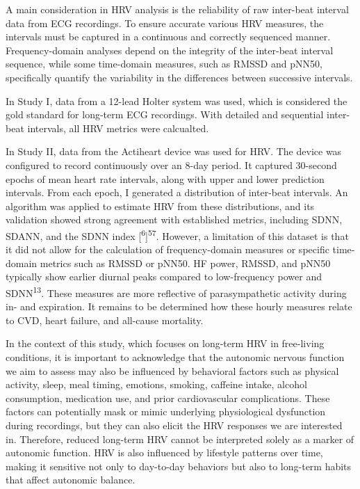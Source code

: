 \documentclass[
  a4paper,
  headsepline=true,
  open=any]{scrbook}
\begin{document}
A main consideration in HRV analysis is the reliability of raw
inter-beat interval data from ECG recordings. To ensure accurate various
HRV measures, the intervals must be captured in a continuous and
correctly sequenced manner. Frequency-domain analyses depend on the
integrity of the inter-beat interval sequence, while some time-domain
measures, such as RMSSD and pNN50, specifically quantify the variability
in the differences between successive intervals.

In Study I, data from a 12-lead Holter system was used, which is
considered the gold standard for long-term ECG recordings. With detailed
and sequential inter-beat intervals, all HRV metrics were calcualted.

In Study II, data from the Actiheart device was used for HRV. The device
was configured to record continuously over an 8-day period. It captured
30-second epochs of mean heart rate intervals, along with upper and
lower prediction intervals. From each epoch, I generated a distribution
of inter-beat intervals. An algorithm was applied to estimate HRV from
these distributions, and its validation showed strong agreement with
established metrics, including SDNN, SDANN, and the SDNN index
{[}\textsuperscript{6}{]}\textsuperscript{57}. However, a limitation of
this dataset is that it did not allow for the calculation of
frequency-domain measures or specific time-domain metrics such as RMSSD
or pNN50. HF power, RMSSD, and pNN50 typically show earlier diurnal
peaks compared to low-frequency power and SDNN\textsuperscript{13}.
These measures are more reflective of parasympathetic activity during
in- and expiration. It remains to be determined how these hourly
measures relate to CVD, heart failure, and all-cause mortality.

In the context of this study, which focuses on long-term HRV in
free-living conditions, it is important to acknowledge that the
autonomic nervous function we aim to assess may also be influenced by
behavioral factors such as physical activity, sleep, meal timing,
emotions, smoking, caffeine intake, alcohol consumption, medication use,
and prior cardiovascular complications. These factors can potentially
mask or mimic underlying physiological dysfunction during recordings,
but they can also elicit the HRV responses we are interested in.
Therefore, reduced long-term HRV cannot be interpreted solely as a
marker of autonomic function. HRV is also influenced by lifestyle
patterns over time, making it sensitive not only to day-to-day behaviors
but also to long-term habits that affect autonomic balance.
\end{document}
